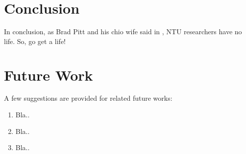 \section{Conclusion}

In conclusion, as Brad Pitt and his chio wife said in \cite{BibtexKey}, NTU researchers have no life. So, go get a life!

\section{Future Work}

A few suggestions are provided for related future works:

\begin{enumerate}

\item Bla.. 

\item Bla..

\item Bla..

\end{enumerate}